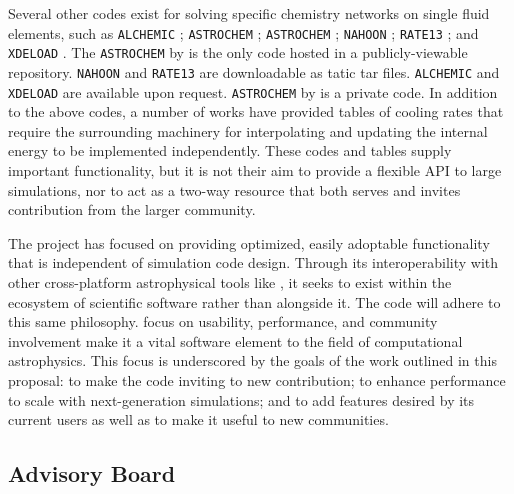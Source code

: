 Several other codes exist for solving specific chemistry
networks on single fluid elements, such as 
\texttt{ALCHEMIC} \citep{2010A&A...522A..42S}; \texttt{ASTROCHEM}
\citep{2013MNRAS.431..455K}; \texttt{ASTROCHEM} \citep[][unrelated to
the first \texttt{ASTROCHEM}]{2013A&A...559A..53M}; \texttt{NAHOON}
\citep{2012ApJS..199...21W}; \texttt{RATE13} \citep[associated with
  the UMIST database][]{2013A&A...550A..36M}; and \texttt{XDELOAD}
\citep{2005Ap&SS.299....1N}.  The \texttt{ASTROCHEM} by
\citet{2013A&A...559A..53M} is the only code hosted in a
publicly-viewable repository.  \texttt{NAHOON} and \texttt{RATE13} are
downloadable as tatic tar files.  \texttt{ALCHEMIC} and
\texttt{XDELOAD} are available upon request.  \texttt{ASTROCHEM} by
\citet{2013MNRAS.431..455K} is a private code.
In addition to the above codes, a number of works have provided tables
of cooling rates \citep{1993ApJS...88..253S, 2009MNRAS.393...99W,
2013MNRAS.434.1043O} that require the surrounding machinery for
interpolating and updating the internal energy to be implemented
independently.
These codes and tables supply important functionality, but it is
not their aim to provide a flexible API to large simulations, nor to
act as a two-way resource that both serves and invites contribution
from the larger community.


The \grackle{} project has focused on providing optimized, easily
adoptable functionality that is independent of simulation code
design.  Through its interoperability with other cross-platform
astrophysical tools like \yt{}, it seeks to exist within the
ecosystem of scientific software rather than alongside it.  The
\dengo{} code will adhere to this same philosophy.
 focus on usability, performance, and community
involvement make it a vital software element to the field of
computational astrophysics.  This focus is underscored by the goals
of the work outlined in this proposal:
to make the code inviting to new contribution; to enhance performance
to scale with next-generation simulations; and to add features desired
by its current users as well as to make it useful to new communities.

\subsection{Advisory Board}


